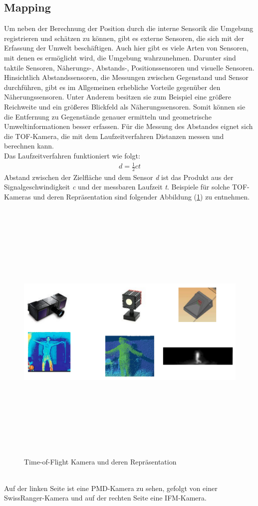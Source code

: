 \subsection{Mapping}
Um neben der Berechnung der Position durch die interne Sensorik die Umgebung registrieren und schätzen zu können, gibt es externe Sensoren, 
die sich mit der Erfassung der Umwelt beschäftigen. Auch hier gibt es viele Arten von Sensoren, mit denen es ermöglicht wird, die Umgebung 
wahrzunehmen. Darunter sind taktile Sensoren, Näherungs-, Abstands-, Positionssensoren und visuelle Sensoren. Hinsichtlich Abstandssensoren, die 
Messungen zwischen Gegenstand und Sensor durchführen, gibt es im Allgemeinen erhebliche Vorteile gegenüber den Näherungssensoren. Unter Anderem 
besitzen sie zum Beispiel eine größere Reichweite und ein größeres Blickfeld als Näherungssensoren. Somit können sie die Entfernung zu Gegenstände 
genauer ermitteln und geometrische Umweltinformationen besser erfassen. Für die Messung des Abstandes eignet sich die \ac{TOF}-Kamera, die 
mit dem Laufzeitverfahren Distanzen messen und berechnen kann. 
\\ 
Das Laufzeitverfahren funktioniert wie folgt:
\begin{align}
    \textit{d} = \frac{1}{2}\textit{ct}
\end{align}
Abstand zwischen der Zielfläche und dem Sensor \textit{d} ist das Produkt aus der Signalgeschwindigkeit \textit{c} und der messbaren Laufzeit 
\textit{t}. Beispiele für solche \acs{TOF}-Kameras und deren Repräsentation sind folgender Abbildung (\ref{pic:tofCam}) zu entnehmen.
\begin{figure}[hbt!]
    \centering
    \includegraphics[width=13cm,height=13cm,keepaspectratio]{2Grundlagen/Bilder/tof_kamera.png}
    \caption{Time-of-Flight Kamera und deren Repräsentation \cite{robotik.2020m}}
    \label{pic:tofCam}
\end{figure}
\\ 
Auf der linken Seite ist eine PMD-Kamera zu sehen, gefolgt von einer SwissRanger-Kamera und auf der rechten Seite eine IFM-Kamera.

